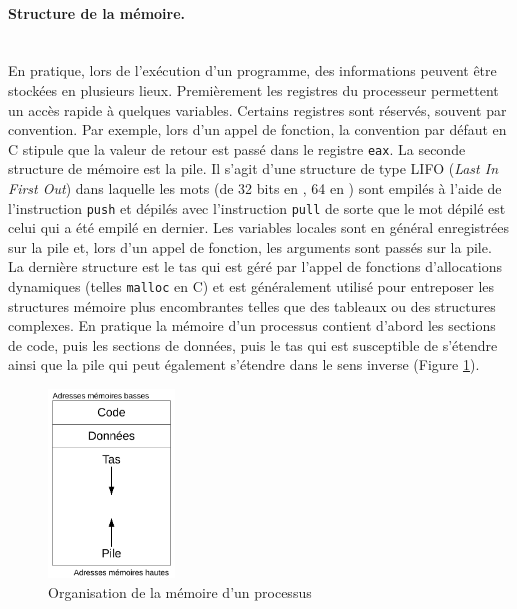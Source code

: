 \paragraph{Structure de la mémoire.}~\\
En pratique, lors de l'exécution d'un programme, des informations peuvent être stockées en plusieurs lieux. 
Premièrement les registres du processeur permettent un accès rapide à quelques variables.
Certains registres sont réservés, souvent par convention. Par exemple, lors d'un appel de fonction, la convention par défaut en C  stipule que la valeur de retour est passé dans le registre \texttt{eax}.
La seconde structure de mémoire est la pile. 
Il s'agit d'une structure de type LIFO (\emph{Last In First Out}) dans laquelle les mots (de 32 bits en \xq, 64 en \xs) sont empilés à l'aide de l'instruction \texttt{push} et dépilés avec l'instruction \texttt{pull} de sorte que le mot dépilé est celui qui a été empilé en dernier.
Les variables locales sont en général enregistrées sur la pile et, lors d'un appel de fonction, les arguments sont passés sur la pile.
La dernière structure est le tas qui est géré par l'appel de fonctions d'allocations dynamiques (telles \texttt{malloc} en C) et est généralement utilisé pour entreposer les structures mémoire plus encombrantes telles que des tableaux ou des structures complexes.
En pratique la mémoire d'un processus contient d'abord les sections de code, puis les sections de données, puis le tas qui est susceptible de s'étendre ainsi que la pile qui peut également s'étendre dans le sens inverse (Figure \ref{fig:mem_process}).

\begin{figure}
\begin{center}
\includegraphics[width=0.3\textwidth]{supports/architecture/pile.pdf}
% 
\caption{Organisation de la mémoire d'un processus}
\label{fig:mem_process}
\end{center}
\end{figure}

